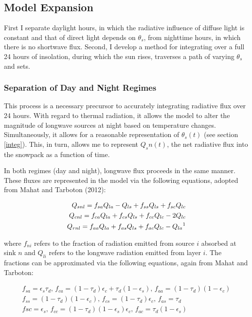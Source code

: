 \documentclass[
10pt, %
letterpaper, %
oneside, %
headinclude,footinclude, %
BCOR5mm, %
]{scrartcl}
\begin{document}
\subsection{Model Expansion}
First I separate daylight hours, in which the radiative influence of diffuse light is constant and that of direct light depends on $\theta_s$, from nighttime hours, in which there is no shortwave flux. Second, I develop a method for integrating over a full 24 hours of insolation, during which the sun rises, traverses a path of varying $\theta_s$ and sets.

\subsubsection{Separation of Day and Night Regimes} \label{typo}
This process is a necessary precursor to accurately integrating radiative flux over 24 hours. With regard to thermal radiation, it allows the model to alter the magnitude of longwave sources at night based on temperature changes. Simultaneously, it allows for a reasonable representation of $\theta_s(t)$ (see section \ref{integ}). This, in turn, allows me to represent $Q_sn(t)$, the net radiative flux into the snowpack as a function of time.

In both regimes (day and night), longwave flux proceeds in the same manner. These fluxes are represented in the model via the following equations, adopted from Mahat and Tarboton (2012):

\begin{align}
Q_{snl} = f_{sa}Q_{la} - Q_{ls} + f_{ss}Q_{ls} + f_{sc}Q_{lc} \\
Q_{cnl} = f_{ca}Q_{la} + f_{cs}Q_{ls} + f_{cc}Q_{lc} - 2Q_{lc} \\
Q_{rnl} = f_{aa}Q_{la} + f_{as}Q_{ls} + f_{ac}Q_{lc} - Q_{la} \text{\footnotemark}
\end{align}

where $f_{ni}$ refers to the fraction of radiation emitted from source $i$ absorbed at sink $n$ and $Q_{li}$ refers to the longwave radiation emitted from layer $i$. The fractions can be approximated via the following equations, again from Mahat and Tarboton:

\begin{align}
	f_{sa} = \epsilon_s \tau_d ,\, f_{ca} = (1-\tau_d)\epsilon_c + \tau_d(1-\epsilon_s) ,\, f_{aa} = (1-\tau_d)(1-\epsilon_c) \\
	f_{ss} = (1-\tau_d)(1-\epsilon_c) ,\, f_{cs} = (1-\tau_d)\epsilon_c ,\, f_{as} = \tau_d \\
	f{sc} = \epsilon_s ,\, f_{cc} = (1- \tau_d)(1 - \epsilon_s)\epsilon_c ,\, f_{ac} = \tau_d(1-\epsilon_s)
\end{align}
\end{document}
